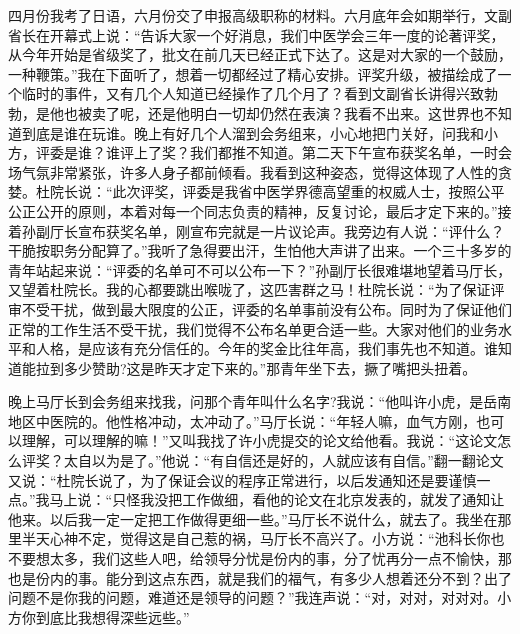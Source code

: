 \documentclass[12pt,oneside]{book}
\begin{document}
四月份我考了日语，六月份交了申报高级职称的材料。六月底年会如期举行，文副省长在开幕式上说：``告诉大家一个好消息，我们中医学会三年一度的论著评奖，从今年开始是省级奖了，批文在前几天已经正式下达了。这是对大家的一个鼓励，一种鞭策。''我在下面听了，想着一切都经过了精心安排。评奖升级，被描绘成了一个临时的事件，又有几个人知道已经操作了几个月了？看到文副省长讲得兴致勃勃，是他也被卖了呢，还是他明白一切却仍然在表演？我看不出来。这世界也不知道到底是谁在玩谁。晚上有好几个人溜到会务组来，小心地把门关好，问我和小方，评委是谁？谁评上了奖？我们都推不知道。第二天下午宣布获奖名单，一时会场气氛非常紧张，许多人身子都前倾看。我看到这种姿态，觉得这体现了人性的贪婪。杜院长说：``此次评奖，评委是我省中医学界德高望重的权威人士，按照公平公正公开的原则，本着对每一个同志负责的精神，反复讨论，最后才定下来的。''接着孙副厅长宣布获奖名单，刚宣布完就是一片议论声。我旁边有人说：``评什么？干脆按职务分配算了。''我听了急得要出汗，生怕他大声讲了出来。一个三十多岁的青年站起来说：``评委的名单可不可以公布一下？''孙副厅长很难堪地望着马厅长，又望着杜院长。我的心都要跳出喉咙了，这匹害群之马！杜院长说：``为了保证评审不受干扰，做到最大限度的公正，评委的名单事前没有公布。同时为了保证他们正常的工作生活不受干扰，我们觉得不公布名单更合适一些。大家对他们的业务水平和人格，是应该有充分信任的。今年的奖金比往年高，我们事先也不知道。谁知道能拉到多少赞助?这是昨天才定下来的。''那青年坐下去，撅了嘴把头扭着。

晚上马厅长到会务组来找我，问那个青年叫什么名字?我说：``他叫许小虎，是岳南地区中医院的。他性格冲动，太冲动了。''马厅长说：``年轻人嘛，血气方刚，也可以理解，可以理解的嘛！''又叫我找了许小虎提交的论文给他看。我说：``这论文怎么评奖？太自以为是了。''他说：``有自信还是好的，人就应该有自信。''翻一翻论文又说：``杜院长说了，为了保证会议的程序正常进行，以后发通知还是要谨慎一点。''我马上说：``只怪我没把工作做细，看他的论文在北京发表的，就发了通知让他来。以后我一定一定把工作做得更细一些。''马厅长不说什么，就去了。我坐在那里半天心神不定，觉得这是自己惹的祸，马厅长不高兴了。小方说：``池科长你也不要想太多，我们这些人吧，给领导分忧是份内的事，分了忧再分一点不愉快，那也是份内的事。能分到这点东西，就是我们的福气，有多少人想着还分不到？出了问题不是你我的问题，难道还是领导的问题？''我连声说：``对，对对，对对对。小方你到底比我想得深些远些。''
\end{document}
